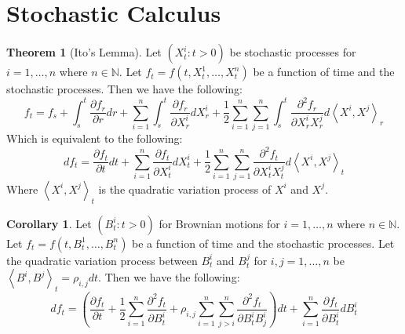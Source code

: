\documentclass[11pt]{article}
\theoremstyle{definition}
\newtheorem{thm}[prop]{Theorem}
\newtheorem{cor}[prop]{Corollary}
\newcommand{\brac}[1]{\left(#1\right)}
\newcommand{\pbrac}[1]{\left\langle#1\right\rangle}
\newcommand{\pardiff}[2]{\frac{\partial #1}{\partial #2}}
\newcommand{\N}{\mathbb{N}}
\begin{document}
\section{Stochastic Calculus}

	\begin{thm}[Ito's Lemma]\label{itosLemma}
		Let $\brac{X_t^i:t>0}$ be stochastic processes for $i=1,\dots,n$ where $n\in\N$. Let $f_t = f(t,X^1_t,\dots,X^n_t)$ be a function of time and the stochastic processes. Then we have the following:
		\begin{equation}\label{intIto}
		f_t = f_s +  \int_{s}^{t}\pardiff{f_r}{r}dr + \sum_{i=1}^{n}\int_{s}^{t}\pardiff{f_r}{X^i_r}dX^i_r + \frac{1}{2}\sum_{i=1}^{n}\sum_{j=1}^{n}\int_{s}^{t}\pardiff{^2f_r}{X_r^iX_r^j}d\pbrac{X^i,X^j}_r
		\end{equation}
		Which is equivalent to the following:
		\begin{equation}\label{ito}
			df_t = \pardiff{f_t}{t}dt + \sum_{i=1}^{n}\pardiff{f_t}{X^i_t}dX^i_t + \frac{1}{2}\sum_{i=1}^{n}\sum_{j=1}^{n}\pardiff{^2f_t}{X_t^iX_t^j}d\pbrac{X^i,X^j}_t
		\end{equation}
		Where $\pbrac{X^i,X^j}_t$ is the quadratic variation process of $X^i$ and $X^j$.
	\end{thm}
	
	\begin{cor}
		Let $\brac{B_t^i:t>0}$ for Brownian motions for $i=1,\dots,n$ where $n\in\N$. Let $f_t = f(t,B^1_t,\dots,B^n_t)$ be a function of time and the stochastic processes. Let the quadratic variation process between $B^i_t$ and $B^j_t$ for $i,j=1,\dots,n$ be $\pbrac{B^i,B^j}_t = \rho_{i,j}dt$. Then we have the following:
		\begin{equation}\label{bmIto}
			df_t = \brac{\pardiff{f_t}{t} +\frac{1}{2}\sum_{i=1}^{n}\pardiff{^2f_t}{B^i_t} + \rho_{i,j}\sum_{i=1}^{n}\sum_{j>i}^{n}\pardiff{^2f_t}{B^i_tB^i_j} }dt + \sum_{i=1}^{n}\pardiff{f_t}{B^i_t}dB^i_t 
		\end{equation}
	\end{cor}
\end{document}
